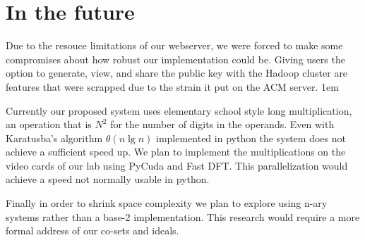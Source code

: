 \documentclass[letterpaper,11pt]{article} %
\begin{document}
\section*{In the future}
\hspace{1em}Due to the resouce limitations of our webserver, we were forced to make some compromises about how robust our implementation could be. Giving users the option to generate, view, and share the public key with the Hadoop cluster are features that were scrapped due to the strain it put on the ACM server. 
\parskip 1em

\hspace{1em}Currently our proposed system uses elementary school style long multiplication, an operation that is \(N^2\) for the number of digits in the operands. Even with Karatusba's algorithm \(\theta( n \lg n)\) implemented in python the system does not achieve a sufficient speed up. We plan to implement the multiplications on the video cards of our lab using PyCuda and Fast DFT. This parallelization would achieve a speed not normally usable in python.

\hspace{1em}Finally in order to shrink space complexity we plan to explore using n-ary systems rather than a base-2 implementation. This research would require a more formal address of our co-sets and ideals.
\end{document}

